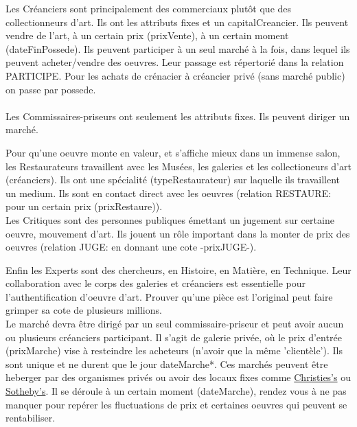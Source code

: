 \documentclass{article}
\begin{document}
    
\begin{multicols}{2}[]
Les Créanciers sont principalement des commerciaux plutôt que des collectionneurs d'art. 
Ils ont les attributs fixes et un capitalCreancier.
Ils peuvent vendre de l'art, à un certain prix (prixVente), à un certain moment (dateFinPossede).
Ils peuvent participer à un seul marché à la fois, dans lequel ils peuvent acheter/vendre des oeuvres.
Leur passage est répertorié dans la relation PARTICIPE.
Pour les achats de crénacier à créancier privé (sans marché public) on passe par possede.
\\ \\

Les Commissaires-priseurs ont seulement les attributs fixes.
Ils peuvent diriger un marché.

Pour qu'une oeuvre monte en valeur, et s'affiche mieux dans un immense salon,
les Restaurateurs travaillent avec les Musées, les galeries et les collectioneurs d'art (créanciers).
Ils ont une spécialité (typeRestaurateur) sur laquelle ils travaillent un medium.
Ils sont en contact direct avec les oeuvres (relation RESTAURE: pour un certain prix (prixRestaure)).
\\

    Les Critiques sont des personnes publiques émettant un jugement sur certaine oeuvre, mouvement d'art.
Ils jouent un rôle important dans la monter de prix des oeuvres (relation JUGE: en donnant une cote -prixJUGE-).
\end{multicols}

\clearpage

Enfin les Experts sont des chercheurs, en Histoire, en Matière, en Technique.
Leur collaboration avec le corps des galeries et créanciers est essentielle pour l'authentification d'oeuvre d'art.
Prouver qu'une pièce est l'original peut faire grimper sa cote de plusieurs millions. \cite{Christ's_Portrait}
\\

Le marché devra être dirigé par un seul commissaire-priseur et peut avoir aucun ou plusieurs créanciers participant.
Il s'agit de galerie privée, où le prix d'entrée (prixMarche) vise à resteindre les acheteurs (n'avoir que la même 'clientèle').
Ils sont unique et ne durent que le jour dateMarche*.
Ces marchés peuvent être heberger par des organismes privés ou avoir des locaux fixes comme \href{https://fr.wikipedia.org/wiki/Christie's}{Christies's} ou \href{https://fr.wikipedia.org/wiki/Sotheby's}{Sotheby's}.
Il se déroule à un certain moment (dateMarche), rendez vous à ne pas manquer pour repérer les fluctuations de prix et certaines oeuvres qui peuvent se rentabiliser.
\\
\end{document}
